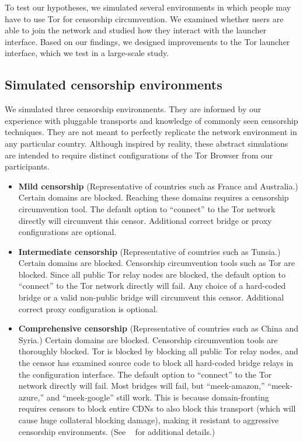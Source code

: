 \documentclass{template}
\begin{document}
To test our hypotheses, we simulated several environments in which people may
have to use Tor for censorship circumvention. We examined whether users are able
to join the network and studied how they interact with the launcher interface.
Based on our findings, we designed improvements to the Tor launcher interface,
which we test in a large-scale study.

\subsection{Simulated censorship environments}
We simulated three censorship environments.
They are informed by our experience with pluggable transports
and knowledge of commonly seen censorship techniques.
They are not meant to perfectly replicate the network environment
in any particular country. Although inspired by reality, these
abstract simulations are intended to require distinct configurations
of the Tor Browser from our participants.

\begin{itemize} \itemsep1pt \parskip0pt 
\item {\bfseries Mild censorship} 
(Representative of countries such as France and Australia.)
Certain domains are blocked. Reaching these 
domains requires a censorship circumvention 
tool. The default option to ``connect'' to the Tor network 
directly will circumvent this censor. Additional correct
bridge or proxy configurations are optional. 

\item {\bfseries Intermediate censorship} 
(Representative of countries such as Tunsia.)
Certain domains are blocked. Censorship circumvention
tools such as Tor are blocked. Since all public Tor
relay nodes are blocked, the default option to ``connect'' to the Tor network
directly will fail. Any choice of a hard-coded bridge
or a valid non-public bridge will circumvent this censor.  
Additional correct proxy configuration is optional.

\item {\bfseries Comprehensive censorship} 
(Representative of countries such as China and Syria.)
Certain domains are blocked. Censorship circumvention tools
are thoroughly blocked. Tor is blocked by blocking all public
Tor relay nodes, and the censor has examined source code to block
all hard-coded bridge relays in the configuration interface. The default option
to ``connect'' to the Tor network directly will fail. Most bridges will fail,
but ``meek-amazon,'' ``meek-azure,'' and ``meek-google'' still work.
This is because domain-fronting requires censors to block entire CDNs to also
block this transport (which will cause huge collateral blocking damage), making
it resistant to aggressive censorship environments.
(See ~\cite{fifield2015blocking} for additional details.)\\
\end{itemize}
\end{document}

